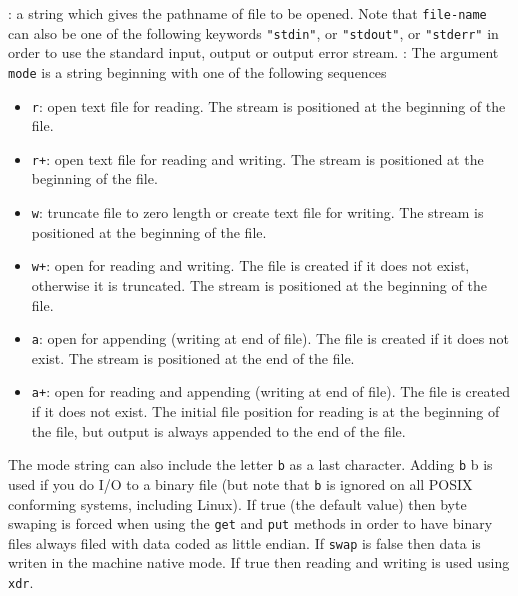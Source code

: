 \begin{parameters}
  \begin{varlist}
    : a string which gives the pathname of file to be opened. 
    Note that \verb+file-name+ can also be one of the following keywords \verb+"stdin"+, or 
    \verb+"stdout"+, or \verb+"stderr"+ in order to use the standard input, output or output error 
    stream.
    : The argument \verb+mode+ is a string beginning  with  one  of  the  following  sequences
    \begin{itemize}
      \item \verb!r!: open text file for reading. The stream is positioned at
        the beginning of the file.
      \item \verb!r+!: open text file for reading and writing. The stream is
        positioned at the beginning of the file.
      \item \verb!w!: truncate file to zero length or create text file for
        writing.  The stream is positioned at the beginning of the file.
      \item \verb!w+!: open for reading and writing.  The file is created if it
        does not exist, otherwise it is truncated.  The stream is positioned at
        the beginning of the file.
      \item \verb!a!: open for appending (writing at end of file).  The file is
        created if it does not exist.  The stream is positioned at the end of
        the file.
      \item \verb!a+!: open for reading and appending (writing at end of file).
        The file is created if it does not exist.  The initial file position for
        reading is at the beginning of the file, but output is always appended
        to the end of the file.
    \end{itemize}
    The mode string can also include the letter \verb+b+ as a last character.
    Adding \verb+b+ b is used if you do I/O to a binary file (but note that
    \verb+b+ is ignored on all POSIX conforming systems, including Linux).
     If true (the default value) then byte swaping is forced when
    using the \verb+get+ and \verb+put+ methods in order to have binary files
    always filed with data coded as little endian.  If \verb+swap+ is false then
    data is writen in the machine native mode.   If true then reading
    and writing is used using \verb+xdr+.
  \end{varlist}
\end{parameters}

